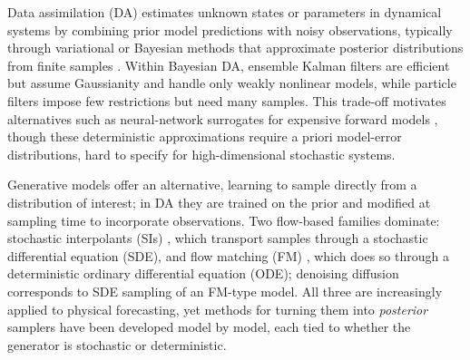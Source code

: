 Data assimilation (DA) estimates unknown states or parameters in dynamical systems by combining prior model predictions with noisy observations, typically through variational or Bayesian methods that approximate posterior distributions from finite samples \cite{evensen_data_2022}. Within Bayesian DA, ensemble Kalman filters are efficient but assume Gaussianity and handle only weakly nonlinear models, while particle filters impose few restrictions but need many samples. This trade-off motivates alternatives such as neural-network surrogates for expensive forward models \cite{mucke_deep_2024, cheng_generalised_2022, zhong_reduced-order_2023, chen_reduced-order_2023}, though these deterministic approximations require a priori model-error distributions, hard to specify for high-dimensional stochastic systems.

Generative models offer an alternative, learning to sample directly from a distribution of interest; in DA they are trained on the prior and modified at sampling time to incorporate observations. Two flow-based families dominate: stochastic interpolants (SIs) \cite{albergo_stochastic_2023, albergo_building_2023, chen_probabilistic_2024}, which transport samples through a stochastic differential equation (SDE), and flow matching (FM) \cite{lipman_flow_2023}, which does so through a deterministic ordinary differential equation (ODE); denoising diffusion \cite{ho_denoising_2020, song_score-based_2021} corresponds to SDE sampling of an FM-type model. All three are increasingly applied to physical forecasting, yet methods for turning them into \emph{posterior} samplers have been developed model by model, each tied to whether the generator is stochastic or deterministic.

